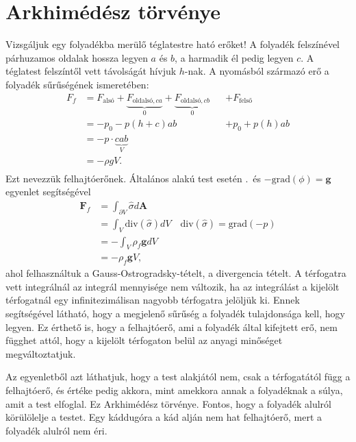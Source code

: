 \documentclass[12pt,a4paper]{scrartcl}
\let\mathbf\bm
\begin{document}
\section{Arkhimédész törvénye}
Vizsgáljuk egy folyadékba merülő téglatestre ható erőket! A folyadék felszínével párhuzamos oldalak hossza legyen $a$ és $b$, a harmadik él pedig legyen $c$. A téglatest felszíntől vett távolságát hívjuk $h$-nak. A nyomásból származó erő a folyadék sűrűségének ismeretében:
\[\begin{aligned}
  F_f &  = {F_{\text{alsó}}} + \underbrace {{F_{\text{oldalsó},ca}}}_0 + \underbrace {{F_{\text{oldalsó},cb}}}_0 && + {F_{\text{felső}}} \\ 
   & =  - {p_0} - p\left( {h + c} \right)ab  && + {p_0} + p\left( h \right)ab \\ 
   &  = - p \cdot \underbrace {cab}_V \\
   &  = - \rho gV. \\ 
\end{aligned} \]
Ezt nevezzük felhajtóerőnek. Általános alakú test esetén .\ és $-{\text{grad}}\left( \phi  \right) = {\mathbf{g}}$ egyenlet segítségével
\[\begin{aligned}
  {{\mathbf{F}}_f} &  = \int_{\partial V} {\hat \sigma d{\mathbf{A}}}  \\ 
   &  = \int_V {{\text{div}}\left( {\hat \sigma } \right)dV} \quad {\text{div}}\left( {\hat \sigma } \right) = {\text{grad}}\left( { - p} \right)  \\ 
   &  =  - \int_V {\rho_f {\mathbf{g}}dV}  \\ 
   &  =  - \rho_f {\mathbf{g}}V,
\end{aligned} \]
ahol felhasználtuk a Gauss-Ostrogradsky-tételt, a divergencia tételt. A térfogatra vett integrálnál az integrál mennyisége nem változik, ha az integrálást a kijelölt térfogatnál egy infinitezimálisan nagyobb térfogatra jelöljük ki. Ennek segítségével látható, hogy a megjelenő sűrűség a folyadék tulajdonsága kell, hogy legyen. Ez érthető is, hogy a felhajtóerő, ami a folyadék által kifejtett erő, nem függhet attól, hogy a kijelölt térfogaton belül az anyagi minőséget megváltoztatjuk.

Az egyenletből azt láthatjuk, hogy a test alakjától nem, csak a térfogatától függ a felhajtóerő, és értéke pedig akkora, mint amekkora annak a folyadéknak a súlya, amit a test elfoglal. Ez Arkhimédész törvénye. Fontos, hogy a folyadék alulról körülölelje a testet. Egy káddugóra a kád alján nem hat felhajtóerő, mert a folyadék alulról nem éri.
\end{document}
